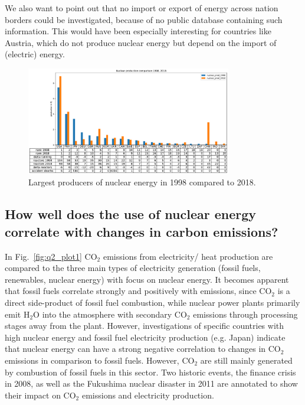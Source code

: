 \documentclass[a4paper,10pt,twocolumn]{scrartcl}
\begin{document}
We also want to point out that no import or export of energy across nation borders could be investigated, because of no public database containing such information. This would have been especially interesting for countries like Austria, which do not produce nuclear energy but depend on the import of (electric) energy.

\begin{figure}[t]
	\centering
	\includegraphics[width=0.8\textwidth]{../figures/q1_plot2.pdf}
	\caption{Largest producers of nuclear energy in 1998 compared to 2018.}
	\label{fig:q2_plot2}
\end{figure}

\subsection{How well does the use of nuclear energy correlate with changes in carbon emissions?}
In Fig.~\ref{fig:q2_plot1} CO$_2$ emissions from electricity/ heat production are compared to the three main types of electricity generation (fossil fuels, renewables, nuclear energy) with focus on nuclear energy. It becomes apparent that fossil fuels correlate strongly and positively with emissions, since CO$_2$ is a direct side-product of fossil fuel combustion, while nuclear power plants primarily emit H$_2$O into the atmosphere with secondary CO$_2$ emissions through processing stages away from the plant. However, investigations of specific countries with high nuclear energy and fossil fuel electricity production (e.g. Japan) indicate that nuclear energy can have a strong negative correlation to changes in CO$_2$ emissions in comparison to fossil fuels. However, CO$_2$ are still mainly generated by combustion of fossil fuels in this sector. Two historic events, the finance crisis in 2008, as well as the Fukushima nuclear disaster in 2011 are annotated to show their impact on CO$_2$ emissions and electricity production.
\end{document}
